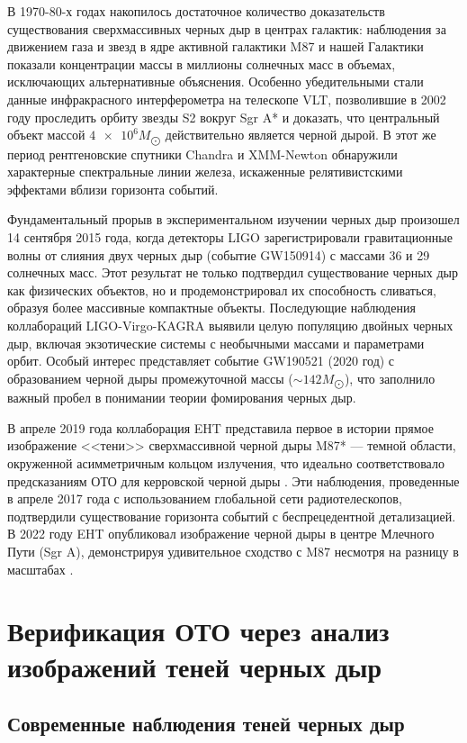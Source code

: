 В 1970-80-х годах накопилось достаточное количество доказательств существования сверхмассивных черных дыр в центрах галактик: наблюдения за движением газа и звезд в ядре активной галактики M87 и нашей Галактики \cite{genzel1994nucleus} показали концентрации массы в миллионы солнечных масс в объемах, исключающих альтернативные объяснения. Особенно убедительными стали данные инфракрасного интерферометра на телескопе VLT, позволившие в 2002 году проследить орбиту звезды S2 вокруг Sgr A* и доказать, что центральный объект массой \(\num{4e6} M_{\bigodot}\)  действительно является черной дырой. В этот же период рентгеновские спутники Chandra и XMM-Newton обнаружили характерные спектральные линии железа, искаженные релятивистскими эффектами вблизи горизонта событий.

Фундаментальный прорыв в экспериментальном изучении черных дыр произошел 14 сентября 2015 года, когда детекторы LIGO зарегистрировали гравитационные волны от слияния двух черных дыр (событие GW150914) с массами 36 и 29 солнечных масс. Этот результат не только подтвердил существование черных дыр как физических объектов, но и продемонстрировал их способность сливаться, образуя более массивные компактные объекты. Последующие наблюдения коллабораций LIGO-Virgo-KAGRA выявили целую популяцию двойных черных дыр, включая экзотические системы с необычными массами и параметрами орбит. Особый интерес представляет событие GW190521 (2020 год) с образованием черной дыры промежуточной массы (\(\sim 142 M_{\bigodot}\)), что заполнило важный пробел в понимании теории фомирования черных дыр.

В апреле 2019 года коллаборация EHT представила первое в истории прямое изображение <<тени>> сверхмассивной черной дыры M87* — темной области, окруженной асимметричным кольцом излучения, что идеально соответствовало предсказаниям ОТО для керровской черной дыры \cite{EHTM872019}. Эти наблюдения, проведенные в апреле 2017 года с использованием глобальной сети радиотелескопов, подтвердили существование горизонта событий с беспрецедентной детализацией. В 2022 году EHT опубликовал изображение черной дыры в центре Млечного Пути (Sgr A), демонстрируя удивительное сходство с M87 несмотря на разницу в масштабах \cite{EHTSgrA2022}. 

\section{Верификация ОТО через анализ изображений теней черных дыр}\label{sec:1.3}

\subsection{Современные наблюдения теней черных дыр}\label{sub:1.3.1}

